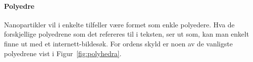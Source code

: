 


\paragraph{Polyedre} Nanopartikler vil i enkelte tilfeller være formet som enkle polyedere. Hva de forskjellige polyedrene som det refereres til i teksten, ser ut som, kan man enkelt finne ut med et internett-bildesøk. For ordens skyld er noen av de vanligste polyedrene vist i Figur~\ref{fig:polyhedra}. 

